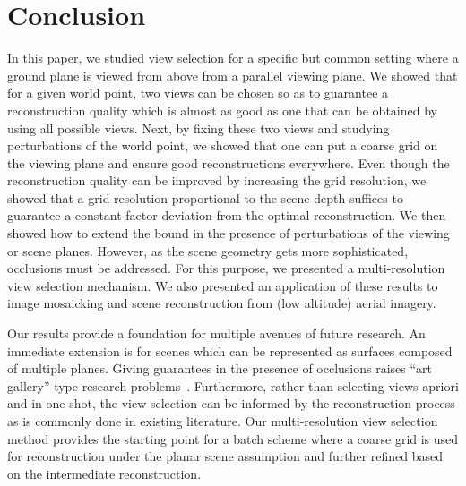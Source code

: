 \section{Conclusion}

In this paper, we studied view selection for a specific but common
setting where a ground plane is viewed from above from a parallel
viewing plane.  We showed that for a given world point, two views can be
chosen so as to guarantee a reconstruction quality which is almost as
good as one that can be obtained by using all possible views. Next, by
fixing these two views and studying perturbations of the world point,
we showed that one can put a coarse grid on the viewing plane and
ensure good reconstructions everywhere. Even though the reconstruction
quality can be improved by increasing the grid resolution, we showed
that a grid resolution proportional to the scene depth suffices to
guarantee a constant factor deviation from the optimal reconstruction.
We then showed how to extend the bound in the presence of perturbations of the viewing or scene planes.
However, as the scene geometry gets more sophisticated, occlusions
must be addressed.  For this purpose, we presented a multi-resolution view selection mechanism.
We also presented an application of these results to image mosaicking and scene reconstruction 
from (low altitude) aerial imagery.  



Our results provide a foundation for multiple
avenues of future research.  An immediate extension is for scenes
which can be represented as surfaces composed of multiple planes.
Giving guarantees in the presence of occlusions 
 raises ``art gallery'' type research
problems~\cite{o1987art}.  Furthermore, rather than selecting views
apriori and in one shot, the view selection can be informed by the
reconstruction process as is commonly done in existing literature. Our
multi-resolution view selection method provides the starting point for a batch  scheme where a
coarse grid is used for reconstruction under the planar scene assumption
and further refined based on the intermediate reconstruction.

